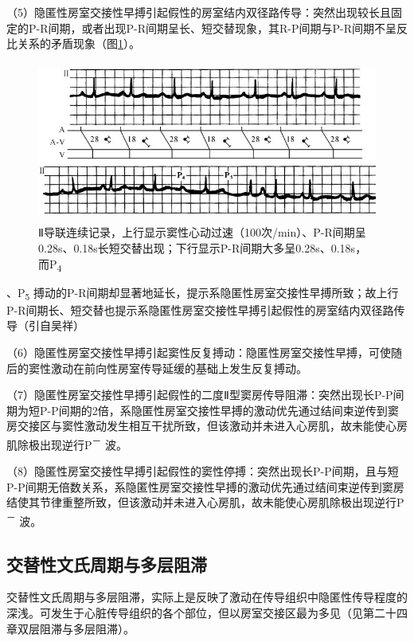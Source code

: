 （5）隐匿性房室交接性早搏引起假性的房室结内双径路传导：突然出现较长且固定的P-R间期，或者出现P-R间期呈长、短交替现象，其R-P间期与P-R间期不呈反比关系的矛盾现象（图\ref{fig35-17}）。

\begin{figure}[!htbp]
 \centering
 \includegraphics[width=4.79167in,height=2.07292in]{./images/Image00570.jpg}
 \captionsetup{justification=centering}
 \caption{Ⅱ导联连续记录，上行显示窦性心动过速（100次/min）、P-R间期呈0.28s、0.18s长短交替出现；下行显示P-R间期大多呈0.28s、0.18s，而P\textsubscript{4}}
 \label{fig35-17}
  \end{figure} 
、P\textsubscript{5}
搏动的P-R间期却显著地延长，提示系隐匿性房室交接性早搏所致；故上行P-R间期长、短交替也提示系隐匿性房室交接性早搏引起假性的房室结内双径路传导（引自吴祥）

（6）隐匿性房室交接性早搏引起窦性反复搏动：隐匿性房室交接性早搏，可使随后的窦性激动在前向性房室传导延缓的基础上发生反复搏动。

（7）隐匿性房室交接性早搏引起假性的二度Ⅱ型窦房传导阻滞：突然出现长P-P间期为短P-P间期的2倍，系隐匿性房室交接性早搏的激动优先通过结间束逆传到窦房交接区与窦性激动发生相互干扰所致，但该激动并未进入心房肌，故未能使心房肌除极出现逆行P\textsuperscript{－}
波。

（8）隐匿性房室交接性早搏引起假性的窦性停搏：突然出现长P-P间期，且与短P-P间期无倍数关系，系隐匿性房室交接性早搏的激动优先通过结间束逆传到窦房结使其节律重整所致，但该激动并未进入心房肌，故未能使心房肌除极出现逆行P\textsuperscript{－}
波。

\protect\hypertarget{text00042.htmlux5cux23subid460}{}{}

\subsection{交替性文氏周期与多层阻滞}

交替性文氏周期与多层阻滞，实际上是反映了激动在传导组织中隐匿性传导程度的深浅。可发生于心脏传导组织的各个部位，但以房室交接区最为多见（见第二十四章双层阻滞与多层阻滞）。

